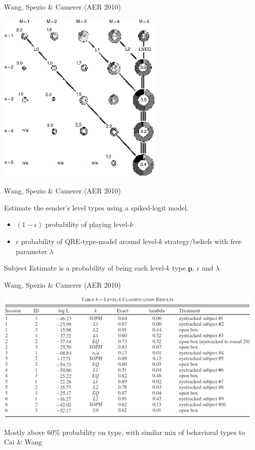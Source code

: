 \documentclass{beamer}
\begin{document}
\begin{frame}{Wang, Spezio \& Camerer (AER 2010)}
\begin{card}
    \begin{center}
    \includegraphics[width=0.6\textwidth]{./i/wsc2010Fig3.eps}
    \end{center}
\end{card}
\end{frame}
\begin{frame}{Wang, Spezio \& Camerer (AER 2010)}
	\begin{card}
Estimate the sender's level types using a spiked-logit model.
		\begin{itemize}
			\item $(1-\epsilon)$ probability of playing level-$k$
			\item $\epsilon$  probability of QRE-type-model around level-$k$ strategy/beliefs with free parameter $\lambda$
		\end{itemize}
		Subject Estimate is a probability of being each level-$k$ type $\mathbf{p}$, $\epsilon$ and $\lambda$
	\end{card}
\end{frame}

\begin{frame}{Wang, Spezio \& Camerer (AER 2010)}
\begin{card}
	\begin{center}\includegraphics[width=0.98\textwidth]{./i/wsc2010Tbl4.eps}\end{center}
\end{card}
    \begin{card}
    Mostly above 60\% probability on type, with similar mix of behavioral types to Cai \& Wang
    \end{card}
\end{frame}
\end{document}
